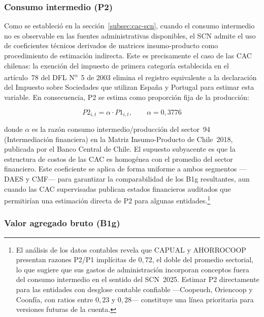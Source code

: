 \subsubsection*{Consumo intermedio (P2)}

Como se estableció en la sección~\ref{subsec:cac-scn}, cuando el consumo 
intermedio no es observable en las fuentes administrativas disponibles, el 
SCN admite el uso de coeficientes técnicos derivados de matrices 
insumo-producto como procedimiento de estimación indirecta. Este es 
precisamente el caso de las CAC chilenas: la exención del impuesto de primera 
categoría establecida en el artículo~78 del DFL N\textsuperscript{o}~5 de 
2003 elimina el registro equivalente a la declaración del Impuesto sobre 
Sociedades que utilizan España y Portugal para estimar esta variable. En 
consecuencia, P2 se estima como proporción fija de la producción:

\begin{equation}
P2_{i,t} = \alpha \cdot P1_{i,t}, \qquad \alpha = 0{,}3776
\label{eq:p2}
\end{equation}

\noindent donde $\alpha$ es la razón consumo intermedio/producción del 
sector~94 (Intermediación financiera) en la Matriz Insumo-Producto de 
Chile~2018, publicada por el Banco Central de Chile. El supuesto subyacente 
es que la estructura de costos de las CAC es homogénea con el promedio del 
sector financiero. Este coeficiente se aplica de forma uniforme a ambos
segmentos ---DAES y CMF--- para garantizar la comparabilidad de los B1g
resultantes, aun cuando las CAC supervisadas publican estados financieros
auditados que permitirían una estimación directa de P2 para algunas
entidades.\footnote{El análisis de los datos contables revela que CAPUAL
y AHORROCOOP presentan razones P2/P1 implícitas de $0{,}72$, el doble del
promedio sectorial, lo que sugiere que sus gastos de administración incorporan
conceptos fuera del consumo intermedio en el sentido del SCN~2025. Estimar
P2 directamente para las entidades con desglose contable confiable
---Coopeuch, Oriencoop y Coonfía, con ratios entre $0{,}23$ y $0{,}28$---
constituye una línea prioritaria para versiones futuras de la cuenta.}
\subsubsection*{Valor agregado bruto (B1g)}

